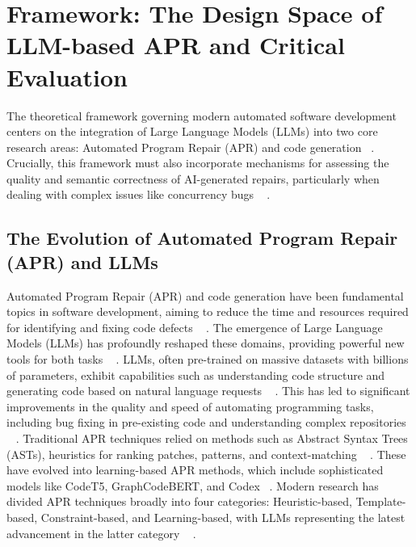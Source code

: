 \section{Framework: The Design Space of LLM-based APR and Critical Evaluation}
\label{sec:framework}

The theoretical framework governing modern automated software development centers on the integration of Large Language Models (LLMs) into two core research areas: Automated Program Repair (APR) and code generation ~\cite{anand2024}. Crucially, this framework must also incorporate mechanisms for assessing the quality and semantic correctness of AI-generated repairs, particularly when dealing with complex issues like concurrency bugs ~\cite{anand2024}
.
\subsection*{The Evolution of Automated Program Repair (APR) and LLMs}
Automated Program Repair (APR) and code generation have been fundamental topics in software development, aiming to reduce the time and resources required for identifying and fixing code defects ~\cite{anand2024,dikici2025}
. The emergence of Large Language Models (LLMs) has profoundly reshaped these domains, providing powerful new tools for both tasks ~\cite{anand2024,yang2025}
.
LLMs, often pre-trained on massive datasets with billions of parameters, exhibit capabilities such as understanding code structure and generating code based on natural language requests ~\cite{anand2024}
. This has led to significant improvements in the quality and speed of automating programming tasks, including bug fixing in pre-existing code and understanding complex repositories ~\cite{anand2024}
.
Traditional APR techniques relied on methods such as Abstract Syntax Trees (ASTs), heuristics for ranking patches, patterns, and context-matching ~\cite{anand2024}
. These have evolved into learning-based APR methods, which include sophisticated models like CodeT5, GraphCodeBERT, and Codex ~\cite{anand2024,yang2023}. Modern research has divided APR techniques broadly into four categories: Heuristic-based, Template-based, Constraint-based, and Learning-based, with LLMs representing the latest advancement in the latter category ~\cite{yang2023}
.
